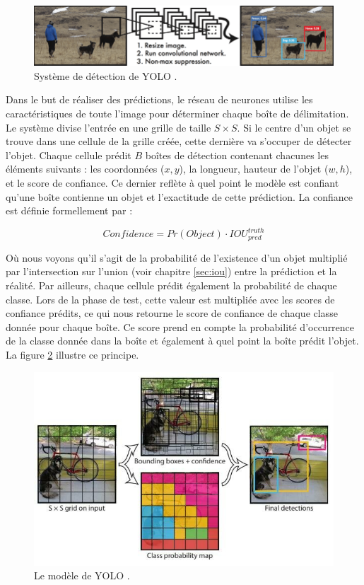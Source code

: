\begin{figure}[hbt!]
    \centering
    \includegraphics[scale=0.45]{Figures/The-YOLO-Detection-System-17.png}
    \caption{Système de détection de YOLO \cite{noauthor_figure_nodate-1}.}
    \label{fig:the_yolo_detection_system}
\end{figure}

Dans le but de réaliser des prédictions, le réseau de neurones utilise les caractéristiques de toute l'image pour déterminer chaque boîte de délimitation. Le système divise l'entrée en une grille de taille $S \times S$. Si le centre d'un objet se trouve dans une cellule de la grille créée, cette dernière va s'occuper de détecter l'objet. Chaque cellule prédit $B$ boîtes de détection contenant chacunes les éléments suivants : les coordonnées ($x, y$), la longueur, hauteur de l'objet ($w, h$), et le score de confiance. Ce dernier reflète à quel point le modèle est confiant qu'une boîte contienne un objet et l'exactitude de cette prédiction. La confiance est définie formellement par :

\[Confidence = Pr(Object) \cdot IOU^{truth}_{pred}\]

Où nous voyons qu'il s'agit de la probabilité de l'existence d'un objet multiplié par l'intersection sur l'union (voir chapitre \ref{sec:iou}) entre la prédiction et la réalité. Par ailleurs, chaque cellule prédit également la probabilité de chaque classe. Lors de la phase de test, cette valeur est multipliée avec les scores de confiance prédits, ce qui nous retourne le score de confiance de chaque classe donnée pour chaque boîte. Ce score prend en compte la probabilité d'occurrence de la classe donnée dans la boîte et également à quel point la boîte prédit l'objet. La figure \ref{fig:yolo_system_detection_class_and_boxes} illustre ce principe.

\begin{figure}[hbt!]
    \centering
    \includegraphics[scale=1.4]{Figures/yolo_system_detection_class_and_boxes.png}
    \caption{Le modèle de YOLO \cite{noauthor_figure_nodate-2}.}
    \label{fig:yolo_system_detection_class_and_boxes}
\end{figure}

